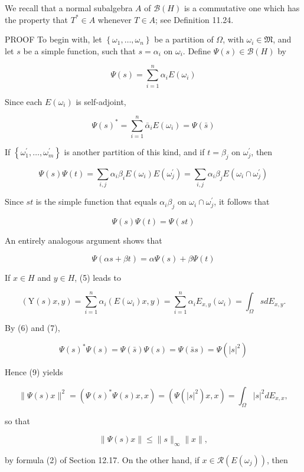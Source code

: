 \documentclass[10pt]{article}
\begin{document}
We recall that a normal subalgebra $A$ of $\mathscr{B}(H)$ is a commutative one which has the property that $T^{*} \in A$ whenever $T \in A$; see Definition 11.24.

PROOF To begin with, let $\left\{\omega_{1}, \ldots, \omega_{n}\right\}$ be a partition of $\Omega$, with $\omega_{i} \in \mathfrak{M}$, and let $s$ be a simple function, such that $s=\alpha_{i}$ on $\omega_{i}$. Define $\Psi(s) \in \mathscr{B}(H)$ by

$$
\Psi(s)=\sum_{i=1}^{n} \alpha_{i} E\left(\omega_{i}\right)
$$

Since each $E\left(\omega_{i}\right)$ is self-adjoint,

$$
\Psi(s)^{*}=\sum_{i=1}^{n} \bar{\alpha}_{i} E\left(\omega_{i}\right)=\Psi(\bar{s})
$$

If $\left\{\omega_{1}^{\prime}, \ldots, \omega_{m}^{\prime}\right\}$ is another partition of this kind, and if $t=\beta_{j}$ on $\omega_{j}^{\prime}$, then

$$
\Psi(s) \Psi(t)=\sum_{i, j} \alpha_{i} \beta_{i} E\left(\omega_{i}\right) E\left(\omega_{j}^{\prime}\right)=\sum_{i, j} \alpha_{i} \beta_{j} E\left(\omega_{i} \cap \omega_{j}^{\prime}\right)
$$

Since $s t$ is the simple function that equals $\alpha_{i} \beta_{j}$ on $\omega_{i} \cap \omega_{j}^{\prime}$, it follows that

$$
\Psi(s) \Psi(t)=\Psi(s t)
$$

An entirely analogous argument shows that

$$
\Psi(\alpha s+\beta t)=\alpha \Psi(s)+\beta \Psi(t)
$$

If $x \in H$ and $y \in H$, (5) leads to

$$
(\mathrm{Y}(s) x, y)=\sum_{i=1}^{n} \alpha_{i}\left(E\left(\omega_{i}\right) x, y\right)=\sum_{i=1}^{n} \alpha_{i} E_{x, y}\left(\omega_{i}\right)=\int_{\Omega} s d E_{x, y} .
$$

By (6) and (7),

$$
\Psi(s)^{*} \Psi(s)=\Psi(\bar{s}) \Psi(s)=\Psi(\bar{s} s)=\Psi\left(|s|^{2}\right)
$$

Hence (9) yields

$$
\|\Psi(s) x\|^{2}=\left(\Psi(s)^{*} \Psi(s) x, x\right)=\left(\Psi\left(|s|^{2}\right) x, x\right)=\int_{\Omega}|s|^{2} d E_{x, x},
$$

so that

$$
\|\Psi(s) x\| \leq\|s\|_{\infty}\|x\|,
$$

by formula (2) of Section 12.17. On the other hand, if $x \in \mathscr{R}\left(E\left(\omega_{j}\right)\right)$, then
\end{document}
